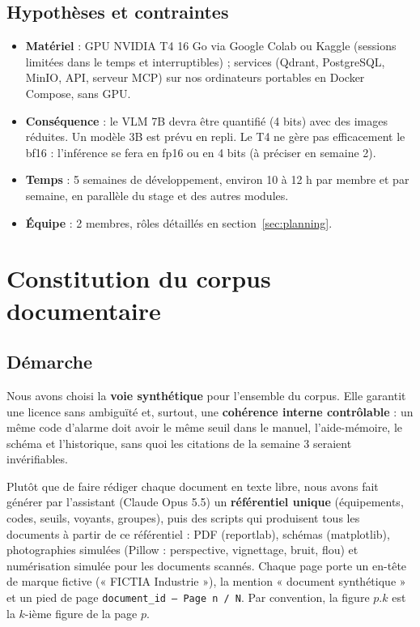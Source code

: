 \documentclass[11pt,a4paper]{article}
\begin{document}
\subsection{Hypothèses et contraintes}
\begin{itemize}
\item \textbf{Matériel} : GPU NVIDIA T4 16 Go via Google Colab ou Kaggle (sessions limitées dans le temps et interruptibles) ; services (Qdrant, PostgreSQL, MinIO, API, serveur MCP) sur nos ordinateurs portables en Docker Compose, sans GPU.
\item \textbf{Conséquence} : le VLM 7B devra être quantifié (4 bits) avec des images réduites. Un modèle 3B est prévu en repli. Le T4 ne gère pas efficacement le bf16 : l'inférence se fera en fp16 ou en 4 bits (à préciser en semaine 2).
\item \textbf{Temps} : 5 semaines de développement, environ 10 à 12 h par membre et par semaine, en parallèle du stage et des autres modules.
\item \textbf{Équipe} : 2 membres, rôles détaillés en section~\ref{sec:planning}.
\end{itemize}

\section{Constitution du corpus documentaire}
\subsection{Démarche}
Nous avons choisi la \textbf{voie synthétique} pour l'ensemble du corpus. Elle garantit une licence sans ambiguïté et, surtout, une \textbf{cohérence interne contrôlable} : un même code d'alarme doit avoir le même seuil dans le manuel, l'aide-mémoire, le schéma et l'historique, sans quoi les citations de la semaine 3 seraient invérifiables.

Plutôt que de faire rédiger chaque document en texte libre, nous avons fait générer par l'assistant (Claude Opus 5.5) un \textbf{référentiel unique} (équipements, codes, seuils, voyants, groupes), puis des scripts qui produisent tous les documents à partir de ce référentiel : PDF (reportlab), schémas (matplotlib), photographies simulées (Pillow : perspective, vignettage, bruit, flou) et numérisation simulée pour les documents scannés. Chaque page porte un en-tête de marque fictive (« FICTIA Industrie »), la mention « document synthétique » et un pied de page \texttt{document\_id -- Page n / N}. Par convention, la figure $p.k$ est la $k$-ième figure de la page $p$.
\end{document}
